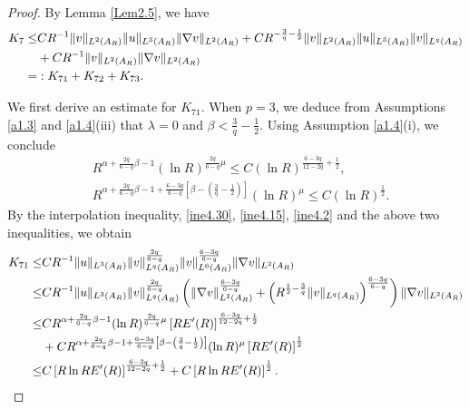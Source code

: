 \documentclass[10pt,a4paper]{amsart}
\begin{document}
\begin{proof}
By Lemma \ref{Lem2.5}, we have
\begin{align}\label{ine4.36}
		K_7 \leq& C R^{-1} \|v\|_{L^2(A_R)}\|u\|_{L^3(A_R)}\|\nabla v\|_{L^2(A_R)}+CR^{-\frac{3}{q}-\frac{1}{2}}\|v\|_{L^2(A_R)}\|u\|_{L^3(A_R)}\|v\|_{L^q(A_R)}\notag\\
        &+C R^{-1} \|v\|_{L^2(A_R)}\|\nabla v\|_{L^2(A_R)}\\
		=&:K_{71} + K_{72} + K_{73}.\notag
\end{align}


We first derive an estimate for $K_{71}$. When $p=3$, we deduce from  Assumptions \ref{a1.3} and \ref{a1.4}(iii) that $\lambda=0$ and $\beta<\frac{3}{q}-\frac{1}{2}$. Using Assumption \ref{a1.4}(i), we conclude
\begin{align*}
&R^{\alpha+\frac{2q}{6-q}\beta-1}(\ln R)^{\frac{2q}{6-q}\mu}\leq C(\ln R)^{\frac{6-3q}{12-2q}+\frac{1}{2}},\\
&R^{\alpha+\frac{2q}{6-q}\beta-1+\frac{6-3q}{6-q}\left[\beta-\left(\frac{3}{q}-\frac{1}{2}\right)\right]}(\ln R)^{\mu}\leq C(\ln R)^\frac{1}{2}.
\end{align*}
By the interpolation inequality, \eqref{ine4.30}, \eqref{ine4.15}, \eqref{ine4.2} and the above two inequalities, we obtain
\begin{align}\label{ine4.36a}
		K_{71} \leq& C R^{-1}\|u\|_{L^3(A_R)}\|v\|_{L^q(A_R)}^{\frac{2q}{6-q}}\|v\|_{L^6(A_R)}^{\frac{6-3q}{6-q}}\|\nabla v\|_{L^2(A_R)}\notag\\
               \leq& C R^{-1}\|u\|_{L^3(A_R)}\|v\|_{L^q(A_R)}^{\frac{2q}{6-q}}\left(\|\nabla v\|_{L^2(A_R)}^{\frac{6-3q}{6-q}}+\left(R^{\frac{1}{2}-\frac{3}{q}} \|v\|_{L^q(A_R)}\right)^{\frac{6-3q}{6-q}}\right)\|\nabla v\|_{L^2(A_R)}\notag\\
               \leq&C R^{\alpha+\frac{2q}{6-q}\beta-1}(\ln R)^{\frac{2q}{6-q}\mu}\left[R E'(R)\right]^{\frac{6-3q}{12-2q}+\frac{1}{2}}\\
               &+C R^{\alpha+\frac{2q}{6-q}\beta-1+\frac{6-3q}{6-q}\left[\beta-\left(\frac{3}{q}-\frac{1}{2}\right)\right]}(\ln R)^{\mu}\left[R E'(R)\right]^{\frac{1}{2}}\notag\\
               \leq&C\left[R\ln RE'(R)\right]^{\frac{6-3q}{12-2q}+\frac{1}{2}}+C\left[R\ln R E'(R)\right]^{\frac{1}{2}}.\notag
\end{align}



\end{proof}
\end{document}
